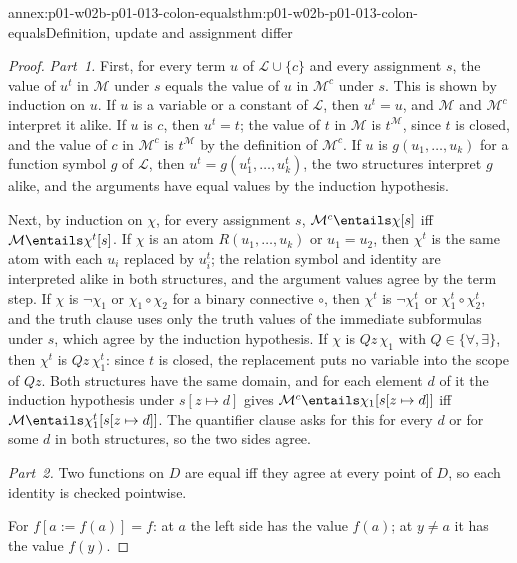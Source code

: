\begin{annexitem}{annex:p01-w02b-p01-013-colon-equals}{thm:p01-w02b-p01-013-colon-equals}{Definition, update and assignment differ}
\begin{proof}
\emph{Part~1.}  First, for every term \(u\) of \(\mathcal L\cup\{c\}\) and
every assignment \(s\), the value of \(u^{t}\) in \(\mathcal M\) under \(s\)
equals the value of \(u\) in \(\mathcal M^{c}\) under \(s\).  This is shown
by induction on \(u\).  If \(u\) is a variable or a constant of
\(\mathcal L\), then \(u^{t}=u\), and \(\mathcal M\) and \(\mathcal M^{c}\)
interpret it alike.  If \(u\) is \(c\), then \(u^{t}=t\); the value of \(t\)
in \(\mathcal M\) is \(t^{\mathcal M}\), since \(t\) is closed, and the value
of \(c\) in \(\mathcal M^{c}\) is \(t^{\mathcal M}\) by the definition of
\(\mathcal M^{c}\).  If \(u\) is \(g(u_1,\ldots,u_k)\) for a function symbol
\(g\) of \(\mathcal L\), then \(u^{t}=g(u_1^{t},\ldots,u_k^{t})\), the two
structures interpret \(g\) alike, and the arguments have equal values by the
induction hypothesis.

Next, by induction on \(\chi\), for every assignment \(s\),
\(\mathcal M^{c}\entails\chi[s]\) iff \(\mathcal M\entails\chi^{t}[s]\).  If
\(\chi\) is an atom \(R(u_1,\ldots,u_k)\) or \(u_1=u_2\), then \(\chi^{t}\)
is the same atom with each \(u_i\) replaced by \(u_i^{t}\); the relation
symbol and identity are interpreted alike in both structures, and the
argument values agree by the term step.  If \(\chi\) is \(\neg\chi_1\) or
\(\chi_1\circ\chi_2\) for a binary connective \(\circ\), then \(\chi^{t}\) is
\(\neg\chi_1^{t}\) or \(\chi_1^{t}\circ\chi_2^{t}\), and the truth clause
uses only the truth values of the immediate subformulas under \(s\), which
agree by the induction hypothesis.  If \(\chi\) is \(Qz\,\chi_1\) with
\(Q\in\{\forall,\exists\}\), then \(\chi^{t}\) is \(Qz\,\chi_1^{t}\): since
\(t\) is closed, the replacement puts no variable into the scope of \(Qz\).
Both structures have the same domain, and for each element \(d\) of it the
induction hypothesis under \(s[z\mapsto d]\) gives
\(\mathcal M^{c}\entails\chi_1[s[z\mapsto d]]\) iff
\(\mathcal M\entails\chi_1^{t}[s[z\mapsto d]]\).  The quantifier clause asks
for this for every \(d\) or for some \(d\) in both structures, so the two
sides agree.

\emph{Part~2.}  Two functions on \(D\) are equal iff they agree at every
point of \(D\), so each identity is checked pointwise.

For \(f[a:=f(a)]=f\): at \(a\) the left side has the value \(f(a)\); at
\(y\neq a\) it has the value \(f(y)\).


\end{proof}
\end{annexitem}
